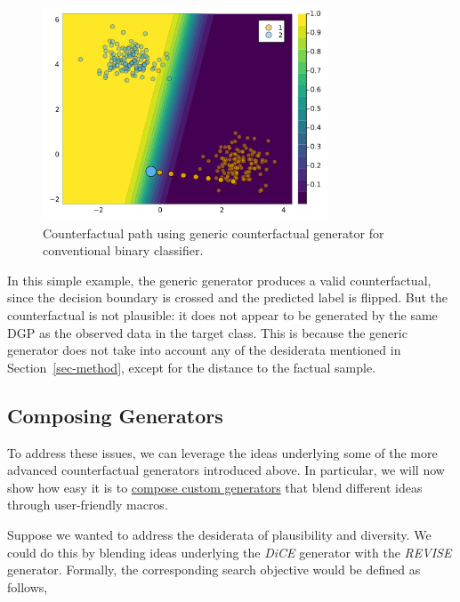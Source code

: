 \documentclass{juliacon}
\begin{document}
\begin{figure}

{\centering \includegraphics[width=3.33333in,height=2.5in]{www/ce_binary.png}

}

\caption{\label{fig-binary}Counterfactual path using generic
counterfactual generator for conventional binary classifier.}

\end{figure}

In this simple example, the generic generator produces a valid
counterfactual, since the decision boundary is crossed and the predicted
label is flipped. But the counterfactual is not plausible: it does not
appear to be generated by the same DGP as the observed data in the
target class. This is because the generic generator does not take into
account any of the desiderata mentioned in Section~\ref{sec-method},
except for the distance to the factual sample.

\hypertarget{sec-gen-comp}{%
\subsection{Composing Generators}\label{sec-gen-comp}}

To address these issues, we can leverage the ideas underlying some of
the more advanced counterfactual generators introduced above. In
particular, we will now show how easy it is to
\href{https://juliatrustworthyai.github.io/CounterfactualExplanations.jl/v0.1/tutorials/generators/}{compose
custom generators} that blend different ideas through user-friendly
macros.

Suppose we wanted to address the desiderata of plausibility and
diversity. We could do this by blending ideas underlying the \emph{DiCE}
generator with the \emph{REVISE} generator. Formally, the corresponding
search objective would be defined as follows,
\end{document}
